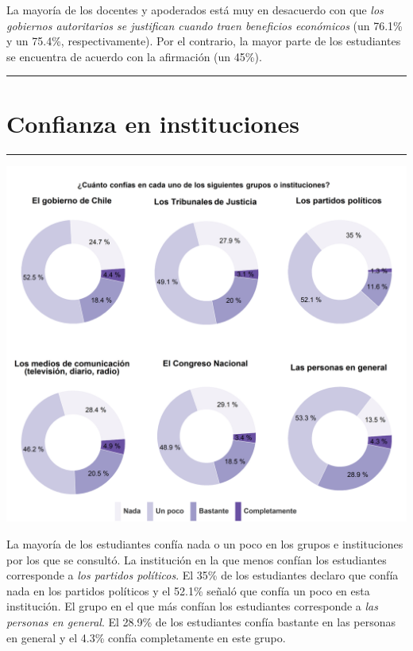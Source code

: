 \documentclass[
  14pt,
]{book}
\let\origfigure\figure
\let\endorigfigure\endfigure
\renewenvironment{figure}[1][2] {
  \expandafter\origfigure\expandafter[H]
} {
  \endorigfigure
}
\begin{document}
La mayoría de los docentes y apoderados está muy en desacuerdo con que \emph{los gobiernos autoritarios se justifican cuando traen beneficios económicos} (un 76.1\% y un 75.4\%, respectivamente). Por el contrario, la mayor parte de los estudiantes se encuentra de acuerdo con la afirmación (un 45\%).

\begin{center}\rule{0.5\linewidth}{0.5pt}\end{center}

\hypertarget{confianza-en-instituciones}{%
\section{Confianza en instituciones}\label{confianza-en-instituciones}}

\begin{center}\rule{0.5\linewidth}{0.5pt}\end{center}

\begin{figure}[!ht]

{\centering \includegraphics[width=0.8\linewidth,]{images/graph_cgp} 

}

\caption{Confianza en grupos e instituciones}\label{fig:unnamed-chunk-51}
\end{figure}

La mayoría de los estudiantes confía nada o un poco en los grupos e instituciones por los que se consultó. La institución en la que menos confían los estudiantes corresponde a \emph{los partidos políticos}. El 35\% de los estudiantes declaro que confía nada en los partidos políticos y el 52.1\% señaló que confía un poco en esta institución. El grupo en el que más confían los estudiantes corresponde a \emph{las personas en general}. El 28.9\% de los estudiantes confía bastante en las personas en general y el 4.3\% confía completamente en este grupo.
\end{document}
